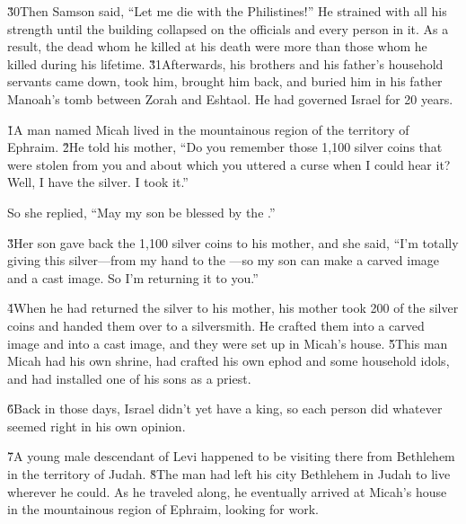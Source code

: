\v{30}Then Samson said, ``Let me die with the Philistines!'' He strained with all his strength until the building collapsed on the officials and every person in it. As a result, the dead whom he killed at his death were more than those whom he killed during his lifetime. \v{31}Afterwards, his brothers and his father's household servants came down, took him, brought him back, and buried him in his father Manoah's tomb between Zorah and Eshtaol. He had governed Israel for 20 years.

\v{1}A man named Micah lived in the mountainous region of the territory of Ephraim. \v{2}He told his mother, ``Do you remember those 1,100 silver coins that were stolen from you and about which you uttered a curse when I could hear it? Well, I have the silver. I took it.''

So she replied, ``May my son be blessed by the .''

\v{3}Her son gave back the 1,100 silver coins to his mother, and she said, ``I'm totally giving this silver---from my hand to the ---so my son can make a carved image and a cast image. So I'm returning it to you.''

\v{4}When he had returned the silver to his mother, his mother took 200 of the silver coins and handed them over to a silversmith. He crafted them into a carved image and into a cast image, and they were set up in Micah's house. \v{5}This man Micah had his own shrine, had crafted his own ephod and some household idols, and had installed one of his sons as a priest.

\v{6}Back in those days, Israel didn't yet have a king, so each person did whatever seemed right in his own opinion.

\v{7}A young male descendant of Levi happened to be visiting there from Bethlehem in the territory of Judah. \v{8}The man had left his city Bethlehem in Judah to live wherever he could. As he traveled along, he eventually arrived at Micah's house in the mountainous region of Ephraim, looking for work.

